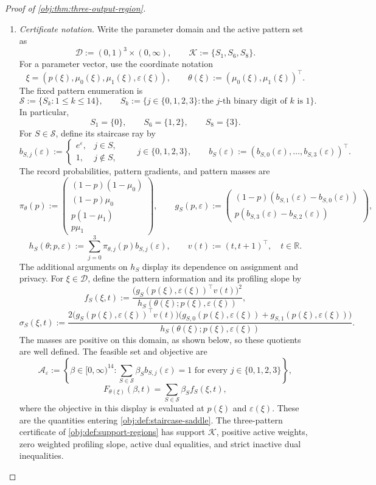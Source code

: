 \begin{proof}[Proof of \cref{obj:thm:three-output-region}]
\begin{enumerate}
\item \textit{Certificate notation.}
Write the parameter domain and the active pattern set as
\[
\mathcal D:=(0,1)^3\times(0,\infty),
\qquad
\mathcal K:=\{S_1,S_6,S_8\}.
\]
For a parameter vector, use the coordinate notation
\[
\xi=(p(\xi),\mu_0(\xi),\mu_1(\xi),\varepsilon(\xi)),
\qquad
\theta(\xi):=(\mu_0(\xi),\mu_1(\xi))^\top.
\]
The fixed pattern enumeration is
\[
\mathcal S:=\{S_k:1\le k\le14\},
\qquad
S_k:=\{j\in\{0,1,2,3\}:\text{the \(j\)-th binary digit of \(k\) is \(1\)}\}.
\]
In particular,
\[
S_1=\{0\},\qquad S_6=\{1,2\},\qquad S_8=\{3\}.
\]
For \(S\in\mathcal S\), define its staircase ray by
\[
b_{S,j}(\varepsilon):=
\begin{cases}
e^\varepsilon,&j\in S,\\
1,&j\notin S,
\end{cases}
\qquad j\in\{0,1,2,3\},
\qquad
b_S(\varepsilon):=
(b_{S,0}(\varepsilon),\ldots,b_{S,3}(\varepsilon))^\top.
\]
The record probabilities, pattern gradients, and pattern masses are
\[
\pi_\theta(p):=
\begin{pmatrix}
(1-p)(1-\mu_0)\\
(1-p)\mu_0\\
p(1-\mu_1)\\
p\mu_1
\end{pmatrix},
\qquad
g_S(p,\varepsilon):=
\begin{pmatrix}
(1-p)(b_{S,1}(\varepsilon)-b_{S,0}(\varepsilon))\\
p(b_{S,3}(\varepsilon)-b_{S,2}(\varepsilon))
\end{pmatrix},
\]
\[
h_S(\theta;p,\varepsilon):=
\sum_{j=0}^3\pi_{\theta,j}(p)b_{S,j}(\varepsilon),
\qquad
v(t):=(t,t+1)^\top,\quad t\in\mathbb R.
\]
The additional arguments on \(h_S\) display its dependence on assignment and privacy. For \(\xi\in\mathcal D\), define the pattern information and its profiling slope by
\[
f_S(\xi,t):=
\frac{\bigl(g_S(p(\xi),\varepsilon(\xi))^\top v(t)\bigr)^2}
{h_S(\theta(\xi);p(\xi),\varepsilon(\xi))},
\]
\[
\sigma_S(\xi,t):=
\frac{
2\bigl(g_S(p(\xi),\varepsilon(\xi))^\top v(t)\bigr)
\bigl(g_{S,0}(p(\xi),\varepsilon(\xi))
      +g_{S,1}(p(\xi),\varepsilon(\xi))\bigr)}
{h_S(\theta(\xi);p(\xi),\varepsilon(\xi))}.
\]
The masses are positive on this domain, as shown below, so these quotients are well defined. The feasible set and objective are
\[
\mathcal A_\varepsilon:=
\left\{\beta\in[0,\infty)^{14}:
\sum_{S\in\mathcal S}\beta_S b_{S,j}(\varepsilon)=1
\text{ for every }j\in\{0,1,2,3\}\right\},
\]
\[
F_{\theta(\xi)}(\beta,t)
=\sum_{S\in\mathcal S}\beta_S f_S(\xi,t),
\]
where the objective in this display is evaluated at \(p(\xi)\) and \(\varepsilon(\xi)\). These are the quantities entering \cref{obj:def:staircase-saddle}. The three-pattern certificate of \cref{obj:def:support-regions} has support \(\mathcal K\), positive active weights, zero weighted profiling slope, active dual equalities, and strict inactive dual inequalities.


\end{enumerate}
\end{proof}

